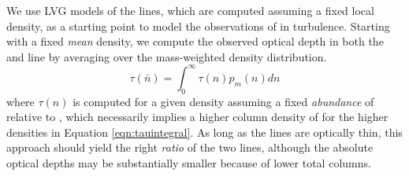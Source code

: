 We use LVG models of the \formaldehyde lines, which are computed assuming a
fixed local density, as a starting point to model the observations of
\formaldehyde in turbulence.   Starting with a fixed \emph{mean} density, we
compute the observed \formaldehyde optical depth in both the \oneone and \twotwo
line by averaging over the mass-weighted density distribution.
\begin{equation}
    \label{eqn:tauintegral}
    \tau(\bar{n}) = \int_0^\infty \tau(n) p_m(n) dn
\end{equation}
where $\tau(n)$ is computed for a given density assuming a fixed
\emph{abundance} of \ortho relative to \hh, which necessarily implies a higher
column density of \ortho for the higher densities in Equation
\ref{eqn:tauintegral}.  As long as the \formaldehyde lines are optically thin,
this approach should yield the right \emph{ratio} of the two lines, although the
absolute optical depths may be substantially smaller because of lower total
\ortho columns.





